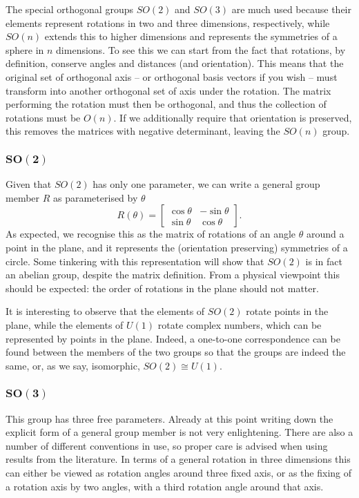 \documentclass[notes.tex]{subfiles}
\begin{document}
The special orthogonal groups $SO(2)$ and $SO(3)$ are much used because their elements represent rotations in two and three dimensions, respectively, while $SO(n)$ extends this to higher dimensions and represents the symmetries of a sphere in $n$ dimensions. To see this we can start from the fact that rotations, by definition, conserve angles and distances (and orientation). This means that the original set of orthogonal axis -- or orthogonal basis vectors if you wish -- must transform into another orthogonal set of axis under the rotation. The matrix performing the rotation must then be orthogonal, and thus  the collection of rotations must be $O(n)$. If we additionally require that orientation is preserved, this removes the matrices with negative determinant, leaving the $SO(n)$ group.

\subsubsection{$\mathbf{SO(2)}$}
Given that $SO(2)$ has only one parameter, we can write a general group member $R$ as parameterised by $\theta$
\begin{equation}
R(\theta)=\left[\begin{matrix} \cos\theta &  -\sin\theta \\ \sin\theta&  \cos\theta \end{matrix}\right].
\label{eq:SO2_parameterisation}
\end{equation}
As expected, we recognise this as the matrix of rotations of an angle $\theta$ around a point in the plane, and it represents the (orientation preserving) symmetries of a circle. Some tinkering with this representation will show that $SO(2)$ is in fact an abelian group, despite the matrix definition. From a physical viewpoint this should be expected: the order of rotations in the plane should not matter.

It is interesting to observe that the elements of $SO(2)$ rotate points in the plane, while the elements of $U(1)$ rotate complex numbers, which can be represented by points in the plane. Indeed, a one-to-one correspondence can be found between the members of the two groups so that the groups are indeed the same, or, as we say, isomorphic, $SO(2)\cong U(1)$.

\subsubsection{$\mathbf{SO(3)}$}
This group has three free parameters. Already at this point writing down the explicit form of a general group member is not very enlightening. There are also a number of different conventions in use, so proper care is advised when using results from the literature. In terms of a general rotation in three dimensions this can either be viewed as rotation angles around three fixed axis, or as the fixing of a rotation axis by two angles, with a third rotation angle around that axis. 
\end{document}
